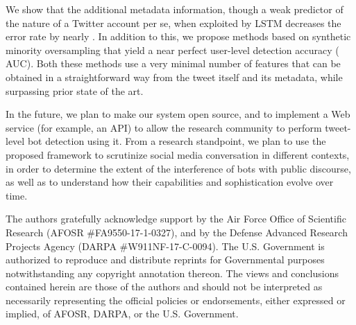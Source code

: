 We show that the additional metadata information, though a weak predictor of the nature of a Twitter account per se, when exploited by LSTM decreases the error rate by nearly . In addition to this, we propose methods based on synthetic minority oversampling that yield a near perfect user-level detection accuracy ( AUC). Both these methods use a very minimal number of features that can be obtained in a straightforward way from the tweet itself and its metadata, while  surpassing prior state of the art. 

In the future, we plan to make our system open source, and to implement a Web service (for example, an API) to allow the research community to perform tweet-level bot detection using it. From a research standpoint, we plan to use the proposed framework to scrutinize social media conversation in different contexts, in order to determine the extent of the interference of bots with public discourse, as well as to understand how their capabilities and sophistication evolve over time.

\begin{acks}
\footnotesize{The authors gratefully acknowledge support by the Air Force Office of Scientific Research (AFOSR \#FA9550-17-1-0327), and by the Defense Advanced Research Projects Agency (DARPA \#W911NF-17-C-0094). The U.S. Government is authorized to reproduce and distribute reprints for Governmental purposes notwithstanding any copyright annotation thereon. The views and conclusions contained herein are those of the authors and should not be interpreted as necessarily representing the official policies or endorsements, either expressed or implied, of AFOSR, DARPA, or the U.S. Government.}
\end{acks}




\balance


